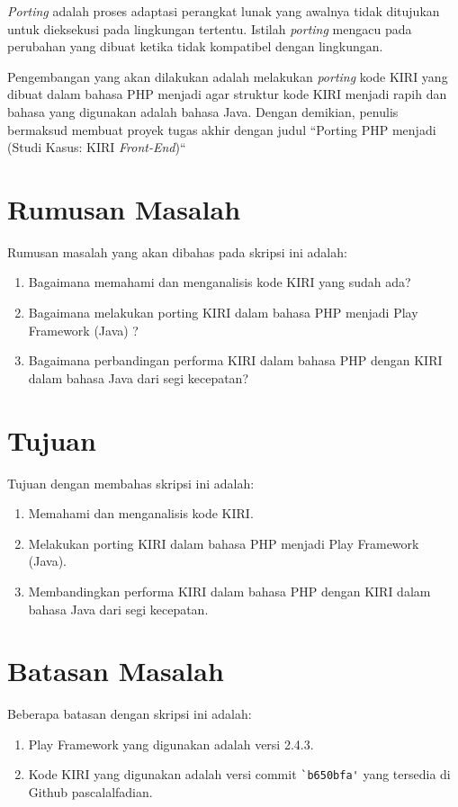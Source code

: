 \textit{Porting} adalah proses adaptasi perangkat lunak yang awalnya tidak ditujukan untuk dieksekusi pada lingkungan tertentu. Istilah \textit{porting} mengacu pada perubahan yang dibuat ketika tidak kompatibel dengan lingkungan.

Pengembangan yang akan dilakukan adalah melakukan \textit{porting} kode KIRI yang dibuat dalam bahasa PHP menjadi \play agar struktur kode KIRI menjadi rapih dan bahasa yang digunakan adalah bahasa Java. Dengan demikian, penulis bermaksud membuat proyek tugas akhir dengan judul ``Porting PHP menjadi \play (Studi Kasus: KIRI \textit{Front-End})``

\section{Rumusan Masalah}
\label{rumusanMasalah}
Rumusan masalah yang akan dibahas pada skripsi ini adalah:
\begin{enumerate}
	\item Bagaimana memahami dan menganalisis kode KIRI yang sudah ada?
	\item Bagaimana melakukan porting KIRI dalam bahasa PHP menjadi Play Framework (Java) ?
	\item Bagaimana perbandingan performa KIRI dalam bahasa PHP dengan KIRI dalam bahasa Java dari segi kecepatan?
\end{enumerate}

\section{Tujuan}
\label{sec:tujuan}
Tujuan dengan membahas skripsi ini adalah:
\begin{enumerate}
	\item Memahami dan menganalisis kode KIRI.
	\item Melakukan porting KIRI dalam bahasa PHP menjadi Play Framework (Java).
	\item Membandingkan performa KIRI dalam bahasa PHP dengan KIRI dalam bahasa Java dari segi kecepatan.
\end{enumerate}

\section{Batasan Masalah}
\label{sec:batasanMasalah}
Beberapa batasan dengan skripsi ini adalah:
\begin{enumerate}
	\item Play Framework yang digunakan adalah versi 2.4.3.
	\item Kode KIRI yang digunakan adalah versi commit \verb!`b650bfa'! yang tersedia di Github pascalalfadian\cite{githubkiri}.
\end{enumerate}


